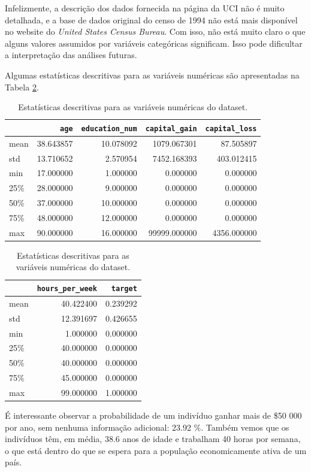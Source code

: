 \documentclass[a4paper, 12pt]{article}
\begin{document}
Infelizmente, a descrição dos dados fornecida na página da UCI não é muito detalhada, e a base de dados original do censo de 1994 não está mais disponível no website do \emph{United States Census Bureau}.
Com isso, não está muito claro o que alguns valores assumidos por variáveis categóricas significam.
Isso pode dificultar a interpretação das análises futuras.

Algumas estatísticas descritivas para as variáveis numéricas são apresentadas na Tabela \ref{tab: describe}.
\begin{table}
    \begin{center}
        \begin{tabular}{lrrrr}
        {} &           \verb|age| &  \verb|education_num| &  \verb|capital_gain| &  \verb|capital_loss| \\
        \hline
        mean  &     38.643857 &      10.078092 &   1079.067301 &     87.505897 \\
        std   &     13.710652 &       2.570954 &   7452.168393 &    403.012415 \\
        min   &     17.000000 &       1.000000 &      0.000000 &      0.000000 \\
        25\%   &     28.000000 &       9.000000 &      0.000000 &      0.000000 \\
        50\%   &     37.000000 &      10.000000 &      0.000000 &      0.000000 \\
        75\%   &     48.000000 &      12.000000 &      0.000000 &      0.000000 \\
        max   &     90.000000 &      16.000000 &  99999.000000 &   4356.000000 \\
        \hline
        \end{tabular}
    \end{center}

    \hspace{2.4cm}
    \begin{tabular}{lrr}
    {} &  \verb|hours_per_week| &        \verb|target| \\
    \hline
    mean  &       40.422400 &      0.239292 \\
    std   &       12.391697 &      0.426655 \\
    min   &        1.000000 &      0.000000 \\
    25\%   &       40.000000 &      0.000000 \\
    50\%   &       40.000000 &      0.000000 \\
    75\%   &       45.000000 &      0.000000 \\
    max   &       99.000000 &      1.000000 \\
    \hline
    \end{tabular}
    \label{tab: describe}
    \caption{Estatísticas descritivas para as variáveis numéricas do dataset.}
\end{table}
É interessante observar a probabilidade de um indivíduo ganhar mais de \$50 000 por ano, sem nenhuma informação adicional: 23.92 \%.
Também vemos que os indivíduos têm, em média, 38.6 anos de idade e trabalham 40 horas por semana, o que está dentro do que se espera para a população economicamente ativa de um país.
\end{document}

